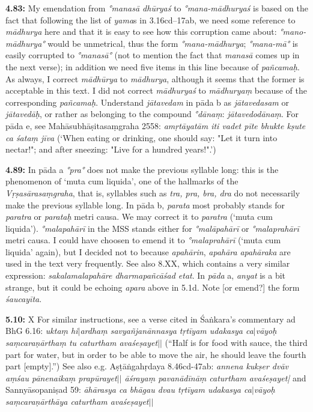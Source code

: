 \documentclass{article}
\newcommand{\vsnum}[1]{\textbf{#1}}
\newcommand{\skt}[1]{\textit{#1}}
\newcommand{\vo}{ X }
\begin{document}
\vsnum{4.83: }My emendation from \skt{°manasā dhūryaś} to \skt{°mana-mādhuryaś} is based on the fact that following the list of \skt{yama}s in 3.16cd--17ab, we need some reference to \skt{mādhurya} here and that it is easy to see how this corruption came about: \skt{°mano-mādhurya°} would be unmetrical, thus the form \skt{°mana-mādhurya}; \skt{°mana-mā°} is easily corrupted to \skt{°manasā°} (not to mention the fact that \skt{manasā} comes up in the next verse); in addition we need five items in this line because of \skt{pañcamaḥ}. As always, I correct \skt{mādhūrya} to \skt{mādhurya}, although it seems that the former is acceptable in this text. I did not correct \skt{mādhuryaś} to \skt{mādhuryaṃ} because of the corresponding \skt{pañcamaḥ}. Understand \skt{jātavedam} in pāda b as \skt{jātavedasam} or \skt{jātavedāḥ}, or rather as belonging to the compound \skt{°dānaṃ}: \skt{jātavedodānaṃ}. For pāda e, see Mahāsubhāṣitasaṃgraha 2558: \textit{amṛtāyatām iti vadet pīte bhukte kṣute ca śataṃ jīva} (`When eating or drinking, one should say: "Let it turn into nectar!"; and after sneezing: "Live for a hundred years!".') 

\vsnum{4.89: }In pāda a \skt{°pra°} does not make the previous syllable long: this is the phenomenon of `muta cum liquida', one of the hallmarks of the \skt{Vṛṣasārasaṃgraha}, that is, syllables such as \skt{tra, pra, bra, dra} do not necessarily make the previous syllable long. In pāda b, \skt{parata} most probably stands for \skt{paratra} or \skt{parataḥ} metri causa. We may correct it to \skt{paratra} (`muta cum liquida'). \skt{°malapahārī} in the MSS stands either for \skt{°malāpahārī} or \skt{°malaprahārī} metri causa. I could have choosen to emend it to \skt{°malaprahārī} (`muta cum liquida' again), but I decided not to because \skt{apahārin}, \skt{apahāra} \skt{apahāraka} are used in the text very frequently. See also 8.XX, which contains a very similar expression: \skt{sakalamalapahāre dharmapañcāśad etat}. 
In \skt{pāda} a, \skt{anyat} is a bit strange, but it could be echoing \skt{apara} above in 5.1d. Note [or emend?] the form \skt{śaucayīta}. 

\vsnum{5.10: }\vo For similar instructions, see a verse cited in Śaṅkara's commentary ad BhG 6.16: \skt{uktaṃ hi$|$ardhaṃ savyañjanānnasya tṛtīyam{ }udakasya ca$|$vāyoḥ saṃcaraṇārthaṃ tu caturtham{ }avaśeṣayet$||$} (``Half is for food with sauce, the third part for water, but in order to be able to move the air, he should leave the fourth part [empty].'') See also e.g. Aṣṭāṅgahṛdaya 8.46cd-47ab: \skt{annena kukṣer dvāv aṃśau pānenaikaṃ prapūrayet$||$ āśrayaṃ pavanādīnāṃ caturtham avaśeṣayet|} and Sannyāsopaniṣad 59: \skt{āhārasya ca bhāgau dvau tṛtīyam udakasya ca$|$vāyoḥ saṃcaraṇārthāya caturtham avaśeṣayet$||$} 
\end{document}
